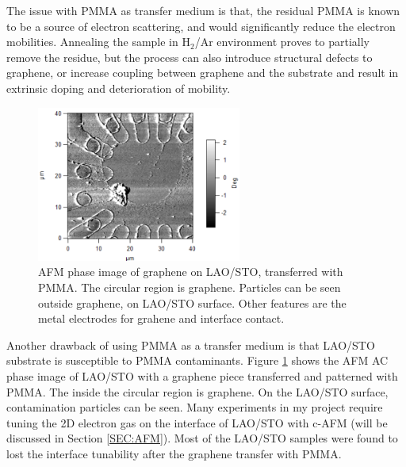 \documentclass[pdflatex, sectionletters, 12pt]{pittetd}    %
\begin{document}
The issue with PMMA as transfer medium is that, the residual PMMA is known to be a source of electron scattering, and would significantly reduce the electron mobilities\cite{pirkle2011effect, lin2011graphene, cheng2011toward}. Annealing the sample in H$_2$/Ar environment proves to partially remove the residue, but the process can also introduce structural defects to graphene\cite{lin2011graphene}, or increase coupling between graphene and the substrate and result in extrinsic doping and deterioration of mobility\cite{cheng2011toward}. 
\\

\begin{figure}[h!]
	\centering
	\includegraphics[width=0.60\textwidth]{Drawing/PMMAResidue.png}
	\caption{AFM phase image of graphene on LAO/STO, transferred with PMMA. The circular region is graphene. Particles can be seen outside graphene, on LAO/STO surface. Other features are the metal electrodes for grahene and interface contact.}
	\label{FIG:PMMAResidue}
\end{figure}

Another drawback of using PMMA as a transfer medium is that LAO/STO substrate is susceptible to PMMA contaminants. Figure \ref{FIG:PMMAResidue} shows the AFM AC phase image of  LAO/STO with a graphene piece transferred and patterned with PMMA. The inside the circular region is graphene. On the LAO/STO surface, contamination particles can be seen. Many experiments in my project require tuning the 2D electron gas on the interface of LAO/STO with c-AFM (will be discussed in Section \ref{SEC:AFM}). Most of the LAO/STO samples were found to lost the interface tunability after the graphene transfer with PMMA. 
\end{document}
